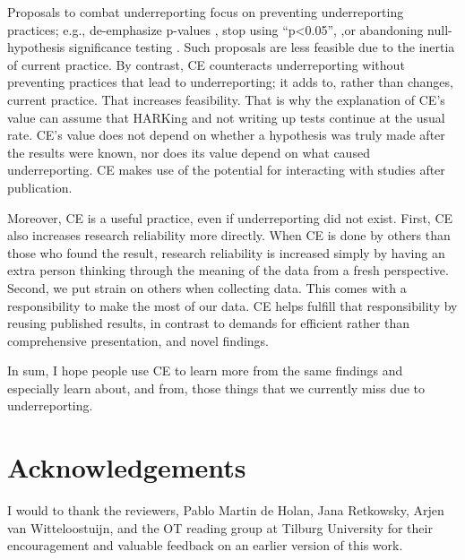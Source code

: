 \documentclass[twocolumn, 10pt]{article}
\begin{document}
Proposals to combat underreporting focus on preventing underreporting practices; e.g., de-emphasize p-values \parencite{Bettis2012}, stop using “p<0.05”, \parencite{Bettis2012, Wasserstein2019},or abandoning null-hypothesis significance testing \parencite{Schwab2011}. Such proposals are less feasible due to the inertia of current practice. By contrast, CE counteracts underreporting without preventing practices that lead to underreporting; it adds to, rather than changes, current practice. That increases feasibility. That is why the explanation of CE’s value can assume that HARKing and not writing up tests continue at the usual rate. CE’s value does not depend on whether a hypothesis was truly made after the results were known, nor does its value depend on what caused underreporting. CE makes use of the potential for interacting with studies after publication.

Moreover, CE is a useful practice, even if underreporting did not exist. First, CE also increases research reliability more directly. When CE is done by others than those who found the result, research reliability is increased simply by having an extra person thinking through the meaning of the data from a fresh perspective. Second, we put strain on others when collecting data. This comes with a responsibility to make the most of our data. CE helps fulfill that responsibility by reusing published results, in contrast to demands for efficient rather than comprehensive presentation, and novel findings.

In sum, I hope people use CE to learn more from the same findings and especially learn about, and from, those things that we currently miss due to underreporting.



\section{Acknowledgements}

I would to thank the reviewers, Pablo Martin de Holan, Jana Retkowsky, Arjen van Witteloostuijn, and the OT reading group at Tilburg University for their encouragement and valuable feedback on an earlier version of this work.



\printbibliography
\end{document}
